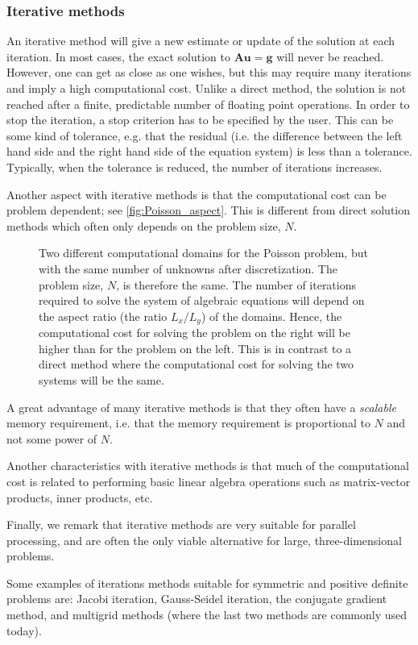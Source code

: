 \subsubsection{Iterative methods}

An iterative method will give a new estimate or update of the solution at each
iteration. In most cases, the exact solution to $\bm A \bm u = \bm g$ will never
be reached. However, one can get as close as one wishes, but this may require
many iterations and imply a high computational cost. Unlike a direct method, the
solution is not reached after a finite, predictable number of floating point
operations. In order to stop the iteration, a stop criterion has to be specified
by the user. This can be some kind of tolerance, e.g. that the residual (i.e.
the difference between the left hand side and the right hand side of the
equation system) is less than a tolerance. Typically, when the tolerance is
reduced, the number of iterations increases.

Another aspect with iterative methods is that the computational cost can be
problem dependent; see \autoref{fig:Poisson_aspect}. This is different from
direct solution methods which often only depends on the problem size, $N$.

\begin{figure}
  \centering
  \caption{
    Two different computational domains for the Poisson problem, but with the
    same number of unknowns after discretization. The problem size, $N$, is
    therefore the same. The number of iterations required to solve the system of
    algebraic equations will depend on the aspect ratio (the ratio $L_x/L_y$) of
    the domains. Hence, the computational cost for solving the problem on the
    right will be higher than for the problem on the left. This is in contrast
    to a direct method where the computational cost for solving the two systems
    will be the same.
  }
  \label{fig:Poisson_aspect}
\end{figure}

A great advantage of many iterative methods is that they often have a
\emph{scalable} memory requirement, i.e. that the memory requirement is
proportional to $N$ and not some power of $N$.

Another characteristics with iterative methods is that much of the computational
cost is related to performing basic linear algebra operations such as
matrix-vector products, inner products, etc.

Finally, we remark that iterative methods are very suitable for parallel
processing, and are often the only viable alternative for large,
three-dimensional problems.

Some examples of iterations methods suitable for symmetric and positive definite
problems are: Jacobi iteration, Gauss-Seidel iteration, the conjugate gradient
method, and multigrid methods (where the last two methods are commonly used
today).
